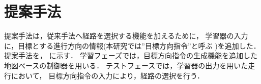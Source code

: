 \documentclass[10pt]{jarticle}
\begin{document}
    \section{提案手法}%
    提案手法は，従来手法へ経路を選択する機能を加えるために，
    学習器の入力に，目標とする進行方向の情報(本研究では”目標方向指令”と呼ぶ )を追加した．
    提案手法を， に示す．
    学習フェーズでは，目標方向指令の生成機能を追加した
    地図べースの制御器を用いる．
    テストフェースでは，学習器の出力を用いた走行において，
    目標方向指令の入力により，経路の選択を行う．
    
\end{document}

